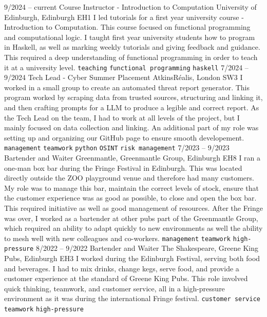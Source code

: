 \documentclass[9pt]{developercv} %
\begin{document}
\vspace{-10 pt}
\begin{entrylist}
	\entry
	{9/2024 --  current}
	{Course Instructor - Introduction to Computation}
	{University of Edinburgh, Edinburgh EH1}
	{
		I led tutorials for a first year university course - Introduction to Computation.
		This course focused on functional programming and computational logic.
		I taught first year university students how to program in Haskell, as well as marking weekly tutorials and giving feedback and guidance.
		This required a deep understanding of functional programming in order to teach it at a university level.
		\newline
		\texttt{teaching} \slashsep \texttt{functional programming} \slashsep \texttt{haskell}
	}
	\entry
	{7/2024 --  9/2024}
	{Tech Lead - Cyber Summer Placement}
	{AtkinsRéalis, London SW3}
	{
		I worked in a small group to create an automated threat report generator.
		This program worked by scraping data from trusted sources, structuring and linking it, and then crafting prompts for a LLM to produce a legible and correct report.
		As the Tech Lead on the team, I had to work at all levels of the project, but I mainly focused on data collection and linking.
		An additional part of my role was setting up and organizing our GitHub page to ensure smooth developement.
		\newline
		\texttt{management} \slashsep \texttt{teamwork} \slashsep \texttt{python} \slashsep \texttt{OSINT} \slashsep \texttt{risk management}
	}
	\entry
        {7/2023 --  9/2023}
		{Bartender and Waiter}
		{Greenmantle, Greenmantle Group, Edinburgh EH8}
		{
			I ran a one-man box bar during the Fringe Festival in Edinburgh. 
			This was located directly outside the ZOO playground venue and therefore had many customers.
			My role was to manage this bar, maintain the correct levels of stock, ensure that the customer experience was as good as possible, to close and open the box bar.
			This required initiative as well as good management of resources.
			After the Fringe was over, I worked as a bartender at other pubs part of the Greenmantle Group, which required an ability to adapt quickly to new environments as well the ability to mesh well with new colleagues and co-workers.
        	\newline
			\texttt{management} \slashsep \texttt{teamwork} \slashsep \texttt{high-pressure}
		}
	\entry
		{8/2022 -- 9/2022}
		{Bartender and Waiter}
		{The Shakespeare, Greene King Pubs, Edinburgh EH3}
		{
			I worked during the Edinburgh Festival, serving both food and beverages.
			I had to mix drinks, change kegs, serve food, and provide a customer experience at the standard of Greene King Pubs.
			This role involved quick thinking, teamwork, and customer service, all in a high-pressure environment as it was during the international Fringe festival.
			\newline
			\texttt{customer service} \slashsep \texttt{teamwork} \slashsep \texttt{high-pressure}
		}
\end{entrylist}
\end{document}
